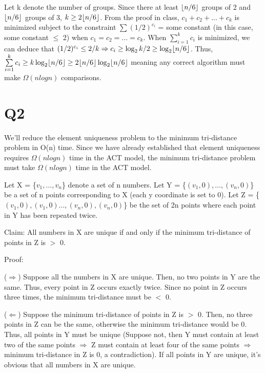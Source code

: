 \documentclass[11pt,a4paper]{article}
\DeclarePairedDelimiter\floor{\lfloor}{\rfloor}
\begin{document}
Let k denote the number of groups. Since there at least $\floor{n/6}$ groups of 2 and $\floor{n/6}$ groups of 3, $k \geq 2\floor{n/6}$. From the proof in class, $c_{1} + c_{2} + ... + c_{k}$ is minimized subject to the constraint $\sum (1/2)^{c_{i}}$ = some constant (in this case, some constant $\leq$ 2) when $c_{1} = c_{2} = ... = c_{k}$. When $\sum\limits_{i=1}^{k} c_{i}$ is minimized, we can deduce that $(1/2)^{c_{i}} \leq 2/k \Rightarrow c_{i} \geq \log_2 k/2 \geq \log_2 \floor{n/6}$. Thus, $\sum\limits_{i=1}^{k} c_{i} \geq k \log_2 \floor{n/6} \geq 2\floor{n/6}\log_2 \floor{n/6}$ meaning any correct algorithm must make $\Omega(nlogn)$ comparisons.


\section*{Q2}

We'll reduce the element uniqueness problem to the minimum tri-distance problem in O(n) time. Since we have already established that element uniqueness requires $\Omega(nlogn)$ time in the ACT model, the minimum tri-distance problem must take $\Omega(nlogn)$ time in the ACT model.

Let X = \{$v_{1},...,v_{n}$\} denote a set of n numbers. Let Y = \{$(v_{1}, 0),...,(v_{n}, 0)$\} be a set of n points corresponding to X (each y coordinate is set to 0). Let Z =  \{$(v_{1}, 0), (v_{1}, 0)...,(v_{n}, 0), (v_{n}, 0)$\} be the set of 2n points where each point in Y has been repeated twice.  \newline

Claim: All numbers in X are unique if and only if the minimum tri-distance of points in Z is $>$ 0. 

Proof: 

($\Rightarrow$) Suppose all the numbers in X are unique. Then, no two points in Y are the same. Thus, every point in Z occurs exactly twice. Since no point in Z occurs three times, the minimum tri-distance must be $<$ 0.

($\Leftarrow$) Suppose the minimum tri-distance of points in Z is $>$ 0. Then, no three points in Z can be the same, otherwise the minimum tri-distance would be 0. Thus, all points in Y must be unique (Suppose not, then Y must contain at least two of the same points $\Rightarrow$ Z must contain at least four of the same points $\Rightarrow$ minimum tri-distance in Z is 0, a contradiction). If all points in Y are unique, it's obvious that all numbers in X are unique. \newline
\end{document}
